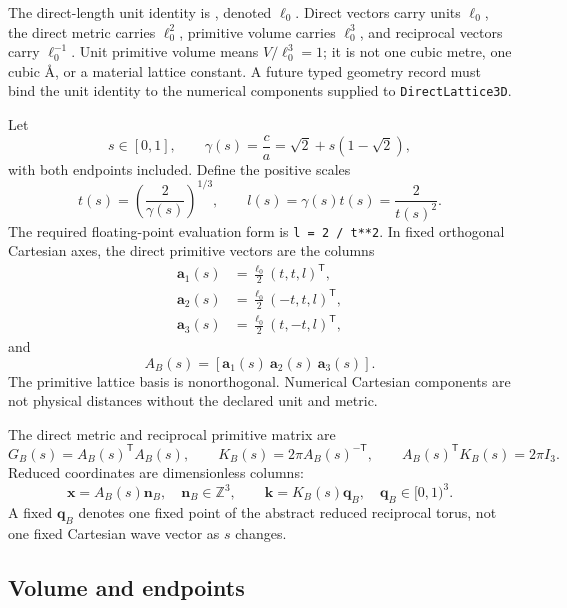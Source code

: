 \documentclass[11pt]{article}
\newcommand{\ZZ}{\mathbb Z}
\begin{document}
The direct-length unit identity is
, denoted $\ell_0$.  Direct vectors carry units
$\ell_0$, the direct metric carries $\ell_0^2$, primitive volume carries $\ell_0^3$,
and reciprocal vectors carry $\ell_0^{-1}$.  Unit primitive volume means
$V/\ell_0^3=1$; it is not one cubic metre, one cubic \AA, or a material lattice
constant.  A future typed geometry record must bind the unit identity to the numerical
components supplied to \texttt{DirectLattice3D}.

Let
\begin{equation}
 s\in[0,1],\qquad
 \gamma(s)=\frac ca=\sqrt2+s(1-\sqrt2),
\end{equation}
with both endpoints included.  Define the positive scales
\begin{equation}
 t(s)=\left(\frac{2}{\gamma(s)}\right)^{1/3},
 \qquad
 l(s)=\gamma(s)t(s)=\frac{2}{t(s)^2}.
\end{equation}
The required floating-point evaluation form is
\texttt{l = 2 / t**2}.  In fixed orthogonal Cartesian axes, the direct primitive
vectors are the columns
\begin{align}
 \mathbf a_1(s)&=\frac{\ell_0}{2}(t,t,l)^{\mathsf T},\\
 \mathbf a_2(s)&=\frac{\ell_0}{2}(-t,t,l)^{\mathsf T},\\
 \mathbf a_3(s)&=\frac{\ell_0}{2}(t,-t,l)^{\mathsf T},
\end{align}
and
\begin{equation}
 A_B(s)=[\mathbf a_1(s)\ \mathbf a_2(s)\ \mathbf a_3(s)].
\end{equation}
The primitive lattice basis is nonorthogonal.  Numerical Cartesian components are not
physical distances without the declared unit and metric.

The direct metric and reciprocal primitive matrix are
\begin{equation}
 G_B(s)=A_B(s)^{\mathsf T}A_B(s),
 \qquad
 K_B(s)=2\pi A_B(s)^{-\mathsf T},
 \qquad
 A_B(s)^{\mathsf T}K_B(s)=2\pi I_3.
\end{equation}
Reduced coordinates are dimensionless columns:
\begin{equation}
 \mathbf x=A_B(s)\mathbf n_B,
 \quad \mathbf n_B\in\ZZ^3,
 \qquad
 \mathbf k=K_B(s)\mathbf q_B,
 \quad \mathbf q_B\in[0,1)^3.
\end{equation}
A fixed $\mathbf q_B$ denotes one fixed point of the abstract reduced reciprocal torus,
not one fixed Cartesian wave vector as $s$ changes.

\subsection{Volume and endpoints}
\end{document}
